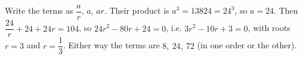 Write the terms as $\dfrac ar$, $a$, $ar$. Their product is $a^3=13824=24^3$, so $a=24$. Then $\dfrac{24}r+24+24r=104$, so $24r^2-80r+24=0$, i.e. $3r^2-10r+3=0$, with roots $r=3$ and $r=\dfrac13$. Either way the terms are $\boxed{8,\ 24,\ 72}$ (in one order or the other).
